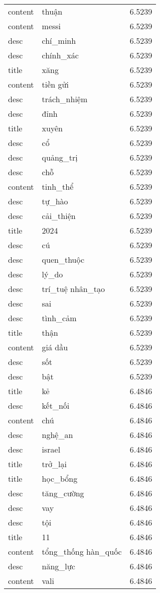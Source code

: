 \documentclass{article}
\begin{document}
\begin{tabular}{lll}
content & thuận & 6.5239\\
content & messi & 6.5239\\
desc & chí\_minh & 6.5239\\
desc & chính\_xác & 6.5239\\
title & xăng & 6.5239\\
content & tiền gửi & 6.5239\\
desc & trách\_nhiệm & 6.5239\\
desc & đỉnh & 6.5239\\
title & xuyên & 6.5239\\
desc & cổ & 6.5239\\
desc & quảng\_trị & 6.5239\\
desc & chỗ & 6.5239\\
content & tinh\_thể & 6.5239\\
desc & tự\_hào & 6.5239\\
desc & cải\_thiện & 6.5239\\
title & 2024 & 6.5239\\
desc & cú & 6.5239\\
desc & quen\_thuộc & 6.5239\\
desc & lý\_do & 6.5239\\
desc & trí\_tuệ nhân\_tạo & 6.5239\\
desc & sai & 6.5239\\
desc & tình\_cảm & 6.5239\\
title & thận & 6.5239\\
content & giá dầu & 6.5239\\
desc & sốt & 6.5239\\
desc & bật & 6.5239\\
title & kẻ & 6.4846\\
desc & kết\_nối & 6.4846\\
content & chú & 6.4846\\
desc & nghệ\_an & 6.4846\\
desc & israel & 6.4846\\
title & trở\_lại & 6.4846\\
title & học\_bổng & 6.4846\\
desc & tăng\_cường & 6.4846\\
desc & vay & 6.4846\\
desc & tội & 6.4846\\
title & 11 & 6.4846\\
content & tổng\_thống hàn\_quốc & 6.4846\\
desc & năng\_lực & 6.4846\\
content & vali & 6.4846\\

\end{tabular}
\end{document}
